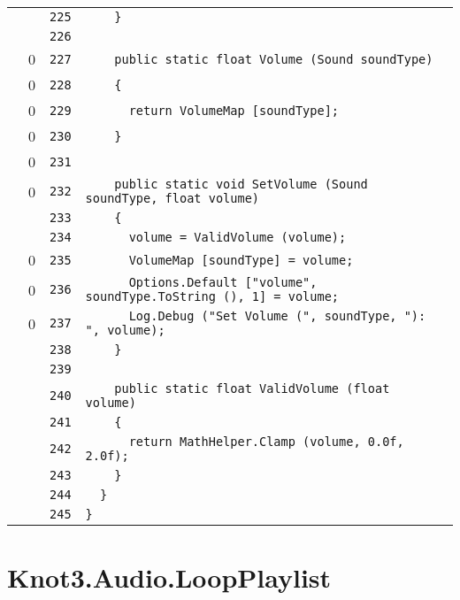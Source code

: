 \documentclass[a4paper,10pt]{article}
\begin{document}
\begin{longtable}[l]{lrrl}
\cellcolor{gray} &  & \verb~225~ & \verb~    }~\\
\cellcolor{gray} &  & \verb~226~ & \verb~~\\
\cellcolor{red} & 0 & \verb~227~ & \verb~    public static float Volume (Sound soundType)~\\
\cellcolor{red} & 0 & \verb~228~ & \verb~    {~\\
\cellcolor{red} & 0 & \verb~229~ & \verb~      return VolumeMap [soundType];~\\
\cellcolor{red} & 0 & \verb~230~ & \verb~    }~\\
\cellcolor{red} & 0 & \verb~231~ & \verb~~\\
\cellcolor{red} & 0 & \verb~232~ & \verb~    public static void SetVolume (Sound soundType, float volume)~\\
\cellcolor{gray} &  & \verb~233~ & \verb~    {~\\
\cellcolor{gray} &  & \verb~234~ & \verb~      volume = ValidVolume (volume);~\\
\cellcolor{red} & 0 & \verb~235~ & \verb~      VolumeMap [soundType] = volume;~\\
\cellcolor{red} & 0 & \verb~236~ & \verb~      Options.Default ["volume", soundType.ToString (), 1] = volume;~\\
\cellcolor{red} & 0 & \verb~237~ & \verb~      Log.Debug ("Set Volume (", soundType, "): ", volume);~\\
\cellcolor{gray} &  & \verb~238~ & \verb~    }~\\
\cellcolor{gray} &  & \verb~239~ & \verb~~\\
\cellcolor{gray} &  & \verb~240~ & \verb~    public static float ValidVolume (float volume)~\\
\cellcolor{gray} &  & \verb~241~ & \verb~    {~\\
\cellcolor{gray} &  & \verb~242~ & \verb~      return MathHelper.Clamp (volume, 0.0f, 2.0f);~\\
\cellcolor{gray} &  & \verb~243~ & \verb~    }~\\
\cellcolor{gray} &  & \verb~244~ & \verb~  }~\\
\cellcolor{gray} &  & \verb~245~ & \verb~}~\\
\end{longtable}
\newpage
\section{Knot3.Audio.LoopPlaylist}
\end{document}
